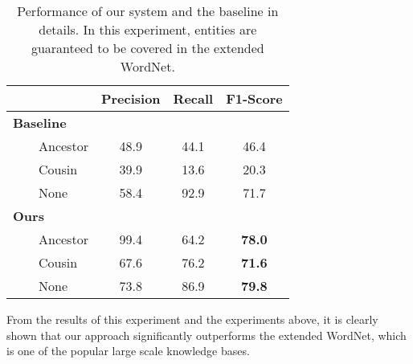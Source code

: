 \begin{table}[h]
	{\small
	\centering
	\begin{tabular}{|l||c|c|c|}
	\hline
                &    Precision  &    Recall  &    F1-Score \\
	\hline
	\hline
 {\bf Baseline} & & & \\
 $\qquad$Ancestor & 48.9 & 44.1 & 46.4\\
 $\qquad$Cousin   & 39.9 & 13.6 & 20.3 \\
 $\qquad$None & 58.4 & 92.9 & 71.7  \\
\hline
	\hline
{\bf Ours} & & &       \\
 $\qquad$Ancestor & 99.4 & 64.2 & {\bf 78.0} \\
 $\qquad$Cousin & 67.6 & 76.2 & {\bf 71.6} \\
 $\qquad$None  & 73.8 & 86.9 & {\bf 79.8} \\
	\hline
	\end{tabular}
	\caption{Performance of our system and the baseline in details.
	In this experiment, entities are guaranteed to be covered in the extended WordNet.}
	}
	\label{table:exp4}
\end{table}
 
From the results of this experiment and the experiments above, it is clearly shown that our approach significantly outperforms the extended WordNet, which is one of the popular large  scale knowledge bases.  
 



